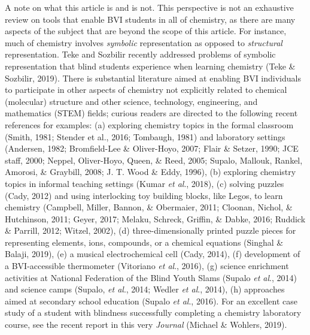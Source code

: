 \documentclass[11.5pt]{sig-alternate} %
\begin{document}
\begin{large}
A note on what this article is and is not. This perspective is not an exhaustive review on tools that enable BVI students in all of chemistry, as there are many aspects of the subject that are beyond the scope of this article. For instance, much of chemistry involves \textit{symbolic} representation as opposed to \textit{structural} representation. Teke and Sozbilir recently addressed problems of symbolic representation that blind students experience when learning chemistry (Teke \& Sozbilir, 2019). There is substantial literature aimed at enabling BVI individuals to participate in other aspects of chemistry not explicitly related to chemical (molecular) structure and other science, technology, engineering, and mathematics (STEM) fields; curious readers are directed to the following recent references for examples: (a) exploring chemistry topics in the formal classroom (Smith, 1981; Stender et al., 2016; Tombaugh, 1981) and laboratory settings (Andersen, 1982; Bromfield-Lee \& Oliver-Hoyo, 2007; Flair \& Setzer, 1990; JCE staff, 2000; Neppel, Oliver-Hoyo, Queen, \& Reed, 2005; Supalo, Mallouk, Rankel, Amorosi, \& Graybill, 2008; J. T. Wood \& Eddy, 1996), (b) exploring chemistry topics in informal teaching settings (Kumar \textit{et al}., 2018), (c) solving puzzles (Cady, 2012) and using interlocking toy building blocks, like Legos, to learn chemistry (Campbell, Miller, Bannon, \& Obermaier, 2011; Cloonan, Nichol, \& Hutchinson, 2011; Geyer, 2017; Melaku, Schreck, Griffin, \& Dabke, 2016; Ruddick \& Parrill, 2012; Witzel, 2002), (d) three-dimensionally printed puzzle pieces for representing elements, ions, compounds, or a chemical equations (Singhal \& Balaji, 2019), (e) a musical electrochemical cell (Cady, 2014), (f) development of a BVI-accessible thermometer (Vitoriano \textit{et al}., 2016), (g) science enrichment activities at National Federation of the Blind Youth Slams (Supalo \textit{et al}., 2014) and science camps (Supalo, \textit{et al}., 2014; Wedler \textit{et al}., 2014), (h) approaches aimed at secondary school education (Supalo \textit{et al}., 2016). For an excellent case study of a student with blindness successfully completing a chemistry laboratory course, see the recent report in this very \textit{Journal} (Michael \& Wohlers, 2019). 


\end{large}
\end{document}
